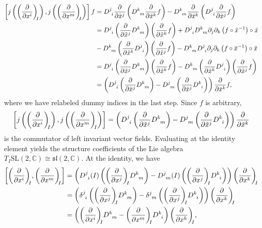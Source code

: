 \begin{align*}
    \left[j\left(\bvec{x^i}{I}\right), j\left(\bvec{x^m}{I}\right)\right]f &= D\indices{^j_i} \bfield{\tilde{x}^j}\left(D\indices{^k_m}\bfield{\tilde{x}^k}f\right) - D\indices{^k_m} \bfield{\tilde{x}^k}\left(D\indices{^j_i}\bfield{\tilde{x}^j}f\right)\\
                                                                          &=D\indices{^j_i}\left(\bfield{\tilde{x}^j}D\indices{^k_m}\right)\left(\bfield{\tilde{x}^k}f\right) + D\indices{^j_i}D\indices{^k_m} \partial_j\partial_k\left(f \circ \tilde{x}^{-1}\right) \circ \tilde{x}\\
                                                                          &-D\indices{^k_m}\left(\bfield{\tilde{x}^k}D\indices{^j_i}\right)\left(\bfield{\tilde{x}^j}f\right) - D\indices{^k_m}D\indices{^j_i} \partial_j\partial_k\left(f \circ \tilde{x}^{-1}\right) \circ \tilde{x}\\
                                                                          &= D\indices{^j_i}\left(\bfield{\tilde{x}^j}D\indices{^k_m}\right)\left(\bfield{\tilde{x}^k}f\right) - D\indices{^k_m}\left(\bfield{\tilde{x}^k}D\indices{^j_i}\right)\left(\bfield{\tilde{x}^j}f\right)\\
                                                                          &= \left(D\indices{^j_i}\left(\bfield{\tilde{x}^j}D\indices{^k_m}\right) - D\indices{^j_m}\left(\bfield{\tilde{x}^j}D\indices{^k_i}\right)\right)\bfield{\tilde{x}^k}f,
\end{align*}
where we have relabeled dummy indices in the last step. Since \(f\) is arbitrary,
\begin{equation*}
     \left[j\left(\bvec{x^i}{I}\right), j\left(\bvec{x^m}{I}\right)\right] = \left(D\indices{^j_i}\left(\bfield{\tilde{x}^j}D\indices{^k_m}\right) - D\indices{^j_m}\left(\bfield{\tilde{x}^j}D\indices{^k_i}\right)\right)\bfield{\tilde{x}^k}
\end{equation*}
is the commutator of left invariant vector fields. Evaluating at the identity element yields the structure coefficients of the Lie algebra \(T_I\mathrm{SL}(2,\mathbb{C}) \cong \mathfrak{sl}(2,\mathbb{C}).\) At the identity, we have
\begin{align*}
    \left[\bvec{x^i}{I}, \bvec{x^m}{I}\right] &= \left(D\indices{^j_i}(I)\left(\bvec{x^j}{I}D\indices{^k_m}\right) - D\indices{^j_m}(I)\left(\bvec{x^j}{I}D\indices{^k_i}\right)\right)\bvec{x^k}{I}\\
                                              &= \left(\delta\indices{^j_i}\left(\bvec{x^j}{I}D\indices{^k_m}\right) - \delta\indices{^j_m}\left(\bvec{x^j}{I}D\indices{^k_i}\right)\right)\bvec{x^k}{I}\\
                                              &= \left(\bvec{x^i}{I}D\indices{^k_m} - \bvec{x^m}{I}D\indices{^k_i}\right)\bvec{x^k}{I},
\end{align*}
